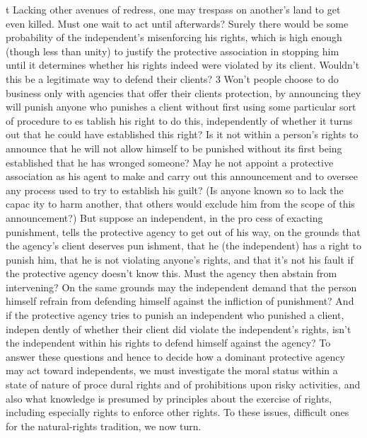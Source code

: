 \documentclass[11pt,openany]{book}
\begin{document}
t Lacking other avenues of redress, one may trespass on another's land to get even killed. Must one wait to act until afterwards? Surely there would be some probability of the independent's misenforcing his rights, which is high enough (though less than unity) to justify the protective association in stopping him until it determines whether his rights indeed were violated by its client. Wouldn't this be a legitimate way to defend their clients? 3 Won't people choose to do business only with agencies that offer their clients protection, by announcing they will punish anyone who punishes a client without first using some particular sort of procedure to es tablish his right to do this, independently of whether it turns out that he could have established this right? Is it not within a person's rights to announce that he will not allow himself to be punished without its first being established that he has wronged someone? May he not appoint a protective association as his agent to make and carry out this announcement and to oversee any process used to try to establish his guilt? (Is anyone known so to lack the capac ity to harm another, that others would exclude him from the scope of this announcement?) But suppose an independent, in the pro cess of exacting punishment, tells the protective agency to get out of his way, on the grounds that the agency's client deserves pun ishment, that he (the independent) has a right to punish him, that he is not violating anyone's rights, and that it's not his fault if the protective agency doesn't know this. Must the agency then abstain from intervening? On the same grounds may the independent demand that the person himself refrain from defending himself against the infliction of punishment? And if the protective agency tries to punish an independent who punished a client, indepen dently of whether their client did violate the independent's rights, isn't the independent within his rights to defend himself against the agency? To answer these questions and hence to decide how a dominant protective agency may act toward independents, we must investigate the moral status within a state of nature of proce dural rights and of prohibitions upon risky activities, and also what knowledge is presumed by principles about the exercise of rights, including especially rights to enforce other rights. To these issues, difficult ones for the natural-rights tradition, we now turn. 
\end{document}
